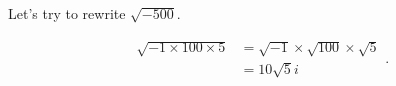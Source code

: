 \label{les__unit_:use_i_to_rewrite_imaginary_numbers}

Let's try to rewrite $\sqrt{-500}$.

\begin{equation}
  \label{spt:use_i_to_rewrite_imaginary_numbers}
  \begin{split}
    \sqrt{-1 \times 100 \times 5} &= \sqrt{-1} \times \sqrt{100} \times \sqrt{5} \\
                                  &= 10\sqrt{5}i
  \end{split}
.\end{equation}

\newpage
